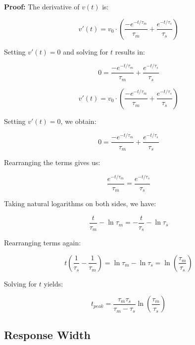 \textbf{Proof:}
The derivative of $v(t)$ is:

\begin{equation}
v'(t) = v_0 \cdot \left(\frac{-e^{-t/\tau_m}}{\tau_m} + \frac{e^{-t/\tau_s}}{\tau_s}\right)
\end{equation}

Setting $v'(t) = 0$ and solving for $t$ results in:

\begin{equation}
0 = \frac{-e^{-t/\tau_m}}{\tau_m} + \frac{e^{-t/\tau_s}}{\tau_s}
\end{equation}

\begin{equation}
v'(t) = v_0 \cdot \left(\frac{-e^{-t/\tau_m}}{\tau_m} + \frac{e^{-t/\tau_s}}{\tau_s}\right)
\end{equation}

Setting $v'(t) = 0$, we obtain:

\begin{equation}
0 = \frac{-e^{-t/\tau_m}}{\tau_m} + \frac{e^{-t/\tau_s}}{\tau_s}
\end{equation}

Rearranging the terms gives us:

\begin{equation}
\frac{e^{-t/\tau_m}}{\tau_m} = \frac{e^{-t/\tau_s}}{\tau_s}
\end{equation}

Taking natural logarithms on both sides, we have:

\begin{equation}
\frac{t}{\tau_m} - \ln \tau_m = - \frac{t}{\tau_s} - \ln \tau_s
\end{equation}

Rearranging terms again:

\begin{equation}
t \left( \frac{1}{\tau_s} - \frac{1}{\tau_m} \right) = \ln \tau_m - \ln \tau_s = \ln\left(\frac{\tau_m}{\tau_s}\right)
\end{equation}

Solving for $t$ yields:

\begin{equation}
t_{peak} = \frac{\tau_m \tau_s}{\tau_m - \tau_s} \ln\left(\frac{\tau_m}{\tau_s}\right)
\end{equation}


\subsection{Response Width}

